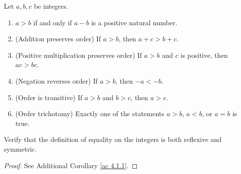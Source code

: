 \begin{lemma}\label{4.1.11}
Let \(a, b, c\) be integers.
\begin{enumerate}
    \item \(a > b\) if and only if \(a - b\) is a positive natural number.
    \item (Addition preserves order) If \(a > b\), then \(a + c > b + c\).
    \item (Positive multiplication preserves order) If \(a > b\) and \(c\) is positive, then \(ac > bc\).
    \item (Negation reverses order) If \(a > b\), then \(-a < -b\).
    \item (Order is transitive) If \(a > b\) and \(b > c\), then \(a > c\).
    \item (Order trichotomy) Exactly one of the statements \(a > b\), \(a < b\), or \(a = b\) is true.
\end{enumerate}
\end{lemma}

\exercisesection

\begin{exercise}\label{ex 4.1.1}
Verify that the definition of equality on the integers is both reflexive and symmetric.
\end{exercise}

\begin{proof}
See Additional Corollary \ref{ac 4.1.1}.
\end{proof}
